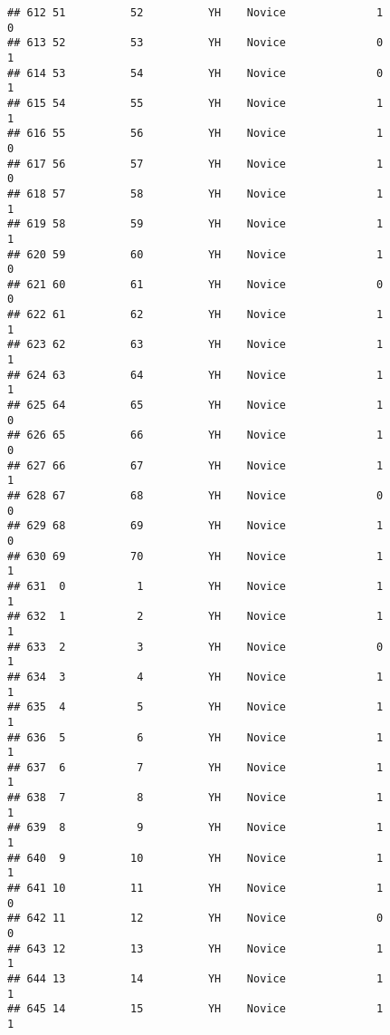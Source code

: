 \documentclass[
]{article}
\begin{document}
\begin{verbatim}
## 612 51          52          YH    Novice              1                 0
## 613 52          53          YH    Novice              0                 1
## 614 53          54          YH    Novice              0                 1
## 615 54          55          YH    Novice              1                 1
## 616 55          56          YH    Novice              1                 0
## 617 56          57          YH    Novice              1                 0
## 618 57          58          YH    Novice              1                 1
## 619 58          59          YH    Novice              1                 1
## 620 59          60          YH    Novice              1                 0
## 621 60          61          YH    Novice              0                 0
## 622 61          62          YH    Novice              1                 1
## 623 62          63          YH    Novice              1                 1
## 624 63          64          YH    Novice              1                 1
## 625 64          65          YH    Novice              1                 0
## 626 65          66          YH    Novice              1                 0
## 627 66          67          YH    Novice              1                 1
## 628 67          68          YH    Novice              0                 0
## 629 68          69          YH    Novice              1                 0
## 630 69          70          YH    Novice              1                 1
## 631  0           1          YH    Novice              1                 1
## 632  1           2          YH    Novice              1                 1
## 633  2           3          YH    Novice              0                 1
## 634  3           4          YH    Novice              1                 1
## 635  4           5          YH    Novice              1                 1
## 636  5           6          YH    Novice              1                 1
## 637  6           7          YH    Novice              1                 1
## 638  7           8          YH    Novice              1                 1
## 639  8           9          YH    Novice              1                 1
## 640  9          10          YH    Novice              1                 1
## 641 10          11          YH    Novice              1                 0
## 642 11          12          YH    Novice              0                 0
## 643 12          13          YH    Novice              1                 1
## 644 13          14          YH    Novice              1                 1
## 645 14          15          YH    Novice              1                 1

\end{verbatim}
\end{document}
